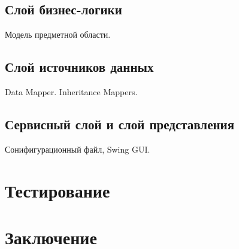 \documentclass[12pt,a4paper,titlepage]{article}
\begin{document}
\subsection{Слой бизнес-логики}
Модель предметной области.
\newpage
\subsection{Слой источников данных}
Data Mapper. Inheritance Mappers.
\newpage
\subsection{Сервисный слой и слой представления}
Сонифигурационный файл, Swing GUI.
\newpage
\section{Тестирование}
\newpage
\section{Заключение}
\end{document}
